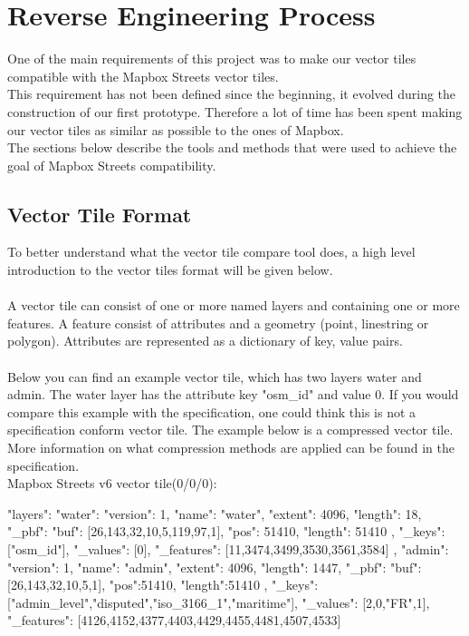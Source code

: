 \section{Reverse Engineering Process}\label{reverse_engineering_process}
One of the main requirements of this project was to make our vector tiles compatible with the Mapbox Streets vector tiles\cite{22_mapbox.com_2015}.
\\
This requirement has not been defined since the beginning, it evolved during the construction of our first prototype.
Therefore a lot of time has been spent making our vector tiles as similar as possible to the ones of Mapbox.
\\
The sections below describe the tools and methods that were used to achieve the goal of Mapbox Streets compatibility.

\subsection{Vector Tile Format}\label{vector_tile_format}
To better understand what the vector tile compare tool does, a high level introduction to the vector tiles format will be given below.
\\\\
A vector tile can consist of one or more named layers and containing one or more features\cite{4_github_2015}. A feature consist of attributes and a geometry (point, linestring or polygon). Attributes are represented as a dictionary of key, value pairs.
\\\\
Below you can find an example vector tile, which has two layers water and admin. The water layer has the attribute key "osm\_id" and value 0. If you would compare this example with the specification\cite{4_github_2015}, one could think this is not a specification conform vector tile. The example below is a compressed vector tile. More information on what compression methods are applied can be found in the specification.\\

Mapbox Streets v6 vector tile(0/0/0):
\begin{jsoncode}
{ 
  "layers": {
    "water": {
      "version": 1,
      "name": "water",
      "extent": 4096,
      "length": 18,
      "_pbf": {
        "buf": [26,143,32,10,5,119,97,1],
        "pos": 51410,
        "length": 51410
      },
      "_keys": ["osm_id"],
      "_values": [0],
      "_features": [11,3474,3499,3530,3561,3584] 
    },
    "admin": {
      "version": 1,
      "name": "admin",
      "extent": 4096,
      "length": 1447,
      "_pbf": {
        "buf": [26,143,32,10,5,1],
        "pos":51410,
        "length":51410
       },
      "_keys": ["admin_level","disputed","iso_3166_1","maritime"],
      "_values": [2,0,"FR",1],
      "_features": [4126,4152,4377,4403,4429,4455,4481,4507,4533]
    }
  } 
}
\end{jsoncode}

